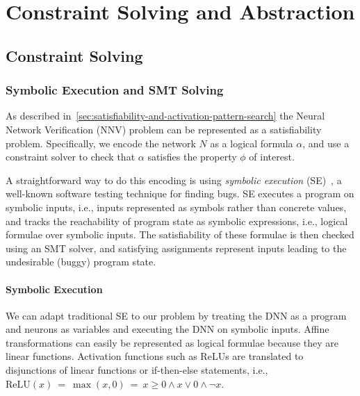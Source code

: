 \documentclass[oneside,11pt,dvipsnames]{book}
\numberwithin{equation}{section}
\theoremstyle{definition}
\theoremstyle{remark}
\newcommand{\relu}[1]{\mathrm{ReLU}\left(#1\right)}
\begin{document}
\part{Constraint Solving and Abstraction}

\chapter{Constraint Solving}\label{chap:constraint-solving}

\section{Symbolic Execution and SMT Solving}\label{sec:se-smt}

As described in~\autoref{sec:satisfiability-and-activation-pattern-search} the Neural Network Verification (NNV) problem can be represented as a satisfiability problem. Specifically, we encode the network $N$ as a logical formula $\alpha$, and use a constraint solver to check that $\alpha$ satisfies the property $\phi$ of interest.

A straightforward way to do this encoding is using \emph{symbolic execution} (SE)~\cite{baldoni2018survey,king1976symbolic}, a well-known software testing technique for finding bugs.  SE executes a program on symbolic inputs, i.e., inputs represented as symbols rather than concrete values, and tracks the reachability of program state as symbolic expressions, i.e., logical formulae over symbolic inputs. The satisfiability of these formulae is then checked using an SMT solver, and satisfying assignments represent inputs leading to the undesirable (buggy) program state.

\subsection{Symbolic Execution}\label{sec:se}
We can adapt traditional SE to our problem by treating the DNN as a program and neurons as variables and executing the DNN on symbolic inputs. Affine transformations can easily be represented as logical formulae because they are linear functions. Activation functions such as ReLUs are translated to disjunctions of linear functions or if-then-else statements, i.e., $\relu{x} ~=~ \max(x,0) ~=~ x \ge 0 \land x \lor 0 \land \neg x$.
\end{document}

